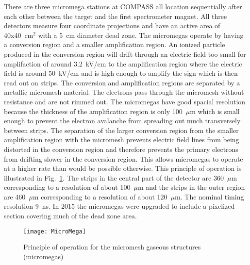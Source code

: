 There are three micromega stations at COMPASS all location sequentially after
each other between the target and the first spectrometer magnet.  All three
detectors measure four coordinate projections and have an active area of
40x40~cm$^2$ with a 5~cm diameter dead zone.  The micromegas operate by having a
conversion region and a smaller amplification region.  An ionized particle
produced in the conversion region will drift through an electric field too small
for amplifaction of around 3.2~kV/cm to the amplification region where the
electric field is around 50~kV/cm and is high enough to amplify the sign which
is then read out on strips.  The conversion and amplification regions are
separated by a metallic micromesh material.  The electrons pass through the
micromesh without resistance and are not rimmed out.  The micromegas have good
spacial resolution because the thickness of the amplification region is only
100~$\mu$m which is small enough to prevent the electron avalanche from
spreading out much transversely between strips.  The separation of the larger
conversion region from the smaller amplification region with the micromesh
prevents electric field lines from being distorted in the conversion region and
therefore prevents the primary electrons from drifting slower in the conversion
region.  This allows micromegas to operate at a higher rate than would be
possible otherwise.  This principle of operation is illustrated in
Fig.~\ref{fig::MicroMega}.  The strips in the central part of the detector are
360~$\mu$m corresponding to a resolution of about 100~$\mu$m and the strips in
the outer region are 460~$\mu$m corresponding to a resolution of about
120~$\mu$m.  The nominal timing resolution 9~ns.  In 2015 the micromegas were
upgraded to include a pixelized section covering much of the dead zone
area. \par

\begin{figure}[h!t]
  \centering
  \texttt{[image: MicroMega]}
  \caption{Principle of operation for the micromesh gaseous structures
    (micromegas)}
  \label{fig::MicroMega}
\end{figure}

